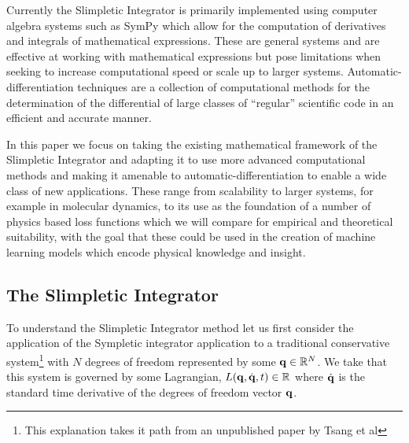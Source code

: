 \documentclass[10pt]{iopart}
\def\SI{Slimpletic Integrator}
\def\SymI{{Sympletic integrator}}
\def\autodiff{automatic-differentiation}
\begin{document}
Currently the \SI{} is primarily implemented using computer algebra systems such as SymPy\cite{sympy} which allow for the computation of derivatives and integrals of mathematical expressions. These are general systems and are effective at working with mathematical expressions but pose limitations when seeking to increase computational speed or scale up to larger systems. Automatic-differentiation  techniques are a collection of computational methods for the determination of the differential of large classes of \enquote{regular} scientific code in an efficient and accurate manner.

In this paper we focus on taking the existing mathematical framework of the \SI{} and adapting it to use more advanced computational methods and making it amenable to \autodiff{} to enable a wide class of new applications. These range from scalability to larger systems, for example in molecular dynamics, to its use as the foundation of a number of physics based loss functions which we will compare for empirical and theoretical suitability, with the goal that these could be used in the creation of machine learning models which encode physical knowledge and insight.


\subsection{The \SI}
\label{sec:intro-si}


To understand the \SI{} method let us first consider the application of the \SymI{} application to a traditional conservative system\footnote{This explanation takes it path from an unpublished paper by Tsang et al\cite{tsangVariationalSymplecticIntegrators}} with $N$ degrees of freedom represented by some $\vb{q} \in \mathbb{R}^N$. We take that this system is governed by some Lagrangian, $L(\vb{q}, \dot{\vb q}, t) \in \mathbb{R}$ where $\dot{\vb q}$ is the standard time derivative of the degrees of freedom vector $\vb q$.
\end{document}
